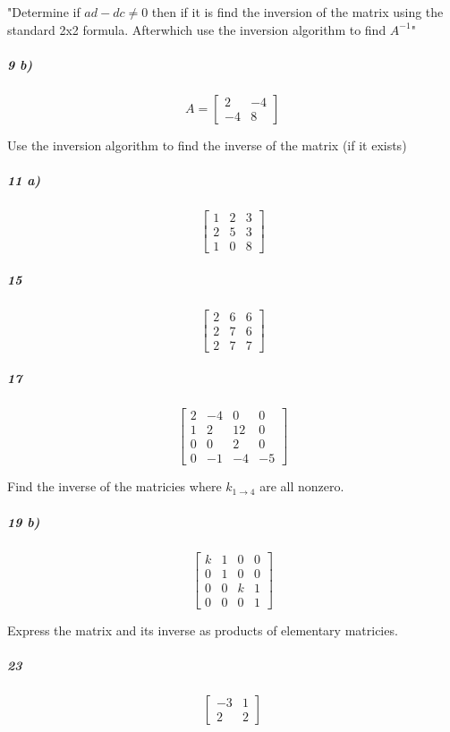 \documentclass[fleqn]{article}
\begin{document}
 "Determine if $ad-dc\ne0$  then if it is  find the inversion of the matrix using the standard 2x2 formula. Afterwhich  use the inversion algorithm to find $A^{-1}$"

\subparagraph{9 b)}

\[
A = \begin{bmatrix} 2 & -4 \\ -4 & 8 \end{bmatrix}
\]
\vfill


\pagebreak
 Use the inversion algorithm to find the inverse of the matrix (if it exists)

\subparagraph{11 a)}

\[
 \begin{bmatrix} 1 & 2 & 3 \\ 2 & 5 & 3 \\ 1 & 0 & 8 \end{bmatrix}
\]
\vfill



\subparagraph{15}

\[
\begin{bmatrix} 2 & 6 & 6 \\ 2 & 7 & 6 \\ 2 & 7 & 7 \end{bmatrix}
\]
\vfill


\pagebreak


\subparagraph{17}

\[
\begin{bmatrix} 2 & -4 & 0 & 0 \\ 1 & 2 & 12 & 0 \\ 0 & 0 & 2 & 0 \\ 0 & -1 & -4 & -5 \end{bmatrix}
\]
\vfill

 Find the inverse of the matricies where $k_{1 \to 4}$ are all nonzero.

\subparagraph{19 b)}

\[
\begin{bmatrix} k & 1 & 0 & 0 \\ 0 & 1 & 0 & 0 \\ 0 & 0 & k & 1 \\ 0 & 0 & 0 & 1 \end{bmatrix}
\]
\vfill


\pagebreak
 Express the matrix and its inverse as products of elementary matricies.

\subparagraph{23}

\[
\begin{bmatrix} -3 & 1 \\ 2 & 2 \end{bmatrix}
\]
\vfill
\end{document}
